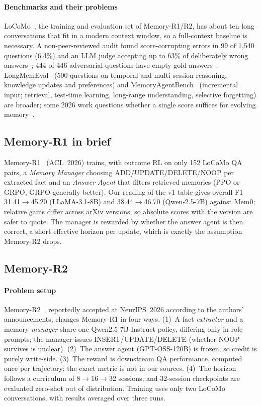 \paragraph{Benchmarks and their problems}
LoCoMo~\citep{maharana2024evaluating}, the training and evaluation set of Memory-R1/R2, has about ten long conversations\unverified{} that fit in a modern context window, so a full-context baseline is necessary. A non-peer-reviewed audit found score-corrupting errors in 99 of 1{,}540 questions (6.4\%) and an LLM judge accepting up to 63\% of deliberately wrong answers~\citep{penfieldlocomo}; 444 of 446 adversarial questions have empty gold answers~\citep{atant2026}. LongMemEval~\citep{wu2024longmemeval} (500 questions on temporal and multi-session reasoning, knowledge updates and preferences) and MemoryAgentBench~\citep{hu2025evaluating} (incremental input; retrieval, test-time learning, long-range understanding, selective forgetting) are broader; some 2026 work questions whether a single score suffices for evolving memory~\citep{onescore2026}.

\subsection{Memory-R1 in brief}
Memory-R1~\citep{yan2025memory} (ACL~2026) trains, with outcome RL on only 152 LoCoMo QA pairs, a \emph{Memory Manager} choosing ADD\slash UPDATE\slash DELETE\slash NOOP per extracted fact and an \emph{Answer Agent} that filters retrieved memories (PPO or GRPO, GRPO generally better). Our reading of the v1 table gives overall F1 31.41$\to$45.20 (LLaMA-3.1-8B) and 38.44$\to$46.70 (Qwen-2.5-7B) against Mem0\unverified; relative gains differ across arXiv versions, so absolute scores with the version are safer to quote. The manager is rewarded by whether the answer agent is then correct\unverified, a short effective horizon per update, which is exactly the assumption Memory-R2 drops.

\subsection{Memory-R2}

\paragraph{Problem setup}
Memory-R2~\citep{yan2026memory}, reportedly accepted at NeurIPS~2026 according to the authors' announcements\unverified, changes Memory-R1 in four ways. (1)~A fact \emph{extractor} and a memory \emph{manager} share one Qwen2.5-7B-Instruct policy, differing only in role prompts; the manager issues INSERT\slash UPDATE\slash DELETE\unverified{} (whether NOOP survives is unclear). (2)~The answer agent (GPT-OSS-120B) is frozen\unverified, so credit is purely write-side. (3)~The reward is downstream QA performance, computed once per trajectory; the exact metric is not in our sources. (4)~The horizon follows a curriculum of 8$\to$16$\to$32 sessions, and 32-session checkpoints are evaluated zero-shot out of distribution. Training uses only two LoCoMo conversations\unverified, with results averaged over three runs\unverified.

